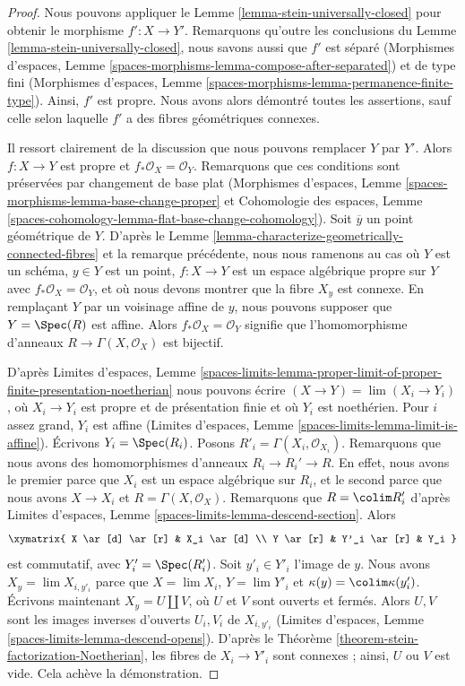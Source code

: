 \begin{proof}
Nous pouvons appliquer le Lemme \ref{lemma-stein-universally-closed} pour obtenir le
morphisme $f' : X \to Y'$.
Remarquons qu'outre les
conclusions du Lemme \ref{lemma-stein-universally-closed}, nous
savons aussi que $f'$ est séparé
(Morphismes d'espaces, Lemme
\ref{spaces-morphisms-lemma-compose-after-separated})
et de type fini
(Morphismes d'espaces, Lemme
\ref{spaces-morphisms-lemma-permanence-finite-type}).
Ainsi, $f'$ est propre. Nous avons alors démontré toutes les
assertions, sauf celle
selon laquelle $f'$ a des fibres géométriques connexes.

\medskip\noindent
Il ressort clairement de la discussion que nous pouvons remplacer $Y$ par $Y'$.
Alors $f : X \to Y$ est propre et $f_*\mathcal{O}_X = \mathcal{O}_Y$.
Remarquons que ces conditions sont préservées par changement de base plat
(Morphismes d'espaces, Lemme \ref{spaces-morphisms-lemma-base-change-proper}
et
Cohomologie des espaces, Lemme
\ref{spaces-cohomology-lemma-flat-base-change-cohomology}).
Soit $\overline{y}$ un point géométrique de $Y$. D'après le
Lemme \ref{lemma-characterize-geometrically-connected-fibres}
et la remarque précédente, nous nous ramenons au cas où $Y$ est un
schéma, $y \in Y$ est un point, $f : X \to Y$ est un espace algébrique propre
sur $Y$ avec $f_*\mathcal{O}_X = \mathcal{O}_Y$,
et où nous devons montrer que la fibre $X_y$ est connexe.
En remplaçant $Y$ par un voisinage affine de $y$, nous pouvons
supposer que $Y = \Spec(R)$ est affine. Alors $f_*\mathcal{O}_X = \mathcal{O}_Y$
signifie que l'homomorphisme d'anneaux
$R \to \Gamma(X, \mathcal{O}_X)$ est bijectif.

\medskip\noindent
D'après Limites d'espaces, Lemme
\ref{spaces-limits-lemma-proper-limit-of-proper-finite-presentation-noetherian}
nous pouvons écrire $(X \to Y) = \lim (X_i \to Y_i)$, où $X_i \to Y_i$
est propre et de présentation finie et où $Y_i$ est noethérien. Pour $i$ assez
grand, $Y_i$ est affine (Limites d'espaces, Lemme
\ref{spaces-limits-lemma-limit-is-affine}).
Écrivons $Y_i = \Spec(R_i)$. Posons $R'_i = \Gamma(X_i, \mathcal{O}_{X_i})$.
Remarquons que nous avons des homomorphismes d'anneaux $R_i \to R_i' \to R$. En effet, nous avons
le premier parce que $X_i$ est un espace algébrique sur $R_i$, et le second parce que
nous avons $X \to X_i$ et $R = \Gamma(X, \mathcal{O}_X)$. Remarquons que
$R = \colim R'_i$ d'après Limites d'espaces, Lemme
\ref{spaces-limits-lemma-descend-section}.
Alors
$$
\xymatrix{
X \ar[d]  \ar[r] & X_i \ar[d] \\
Y \ar[r] & Y'_i \ar[r] & Y_i
}
$$
est commutatif, avec $Y'_i = \Spec(R'_i)$.
Soit $y'_i \in Y'_i$ l'image de $y$.
Nous avons $X_y = \lim X_{i, y'_i}$ parce que $X = \lim X_i$,
$Y = \lim Y'_i$ et $\kappa(y) = \colim \kappa(y'_i)$.
Écrivons maintenant $X_y = U \amalg V$, où $U$ et $V$ sont ouverts et fermés.
Alors $U, V$ sont les images inverses d'ouverts $U_i, V_i$ de $X_{i, y'_i}$
(Limites d'espaces, Lemme \ref{spaces-limits-lemma-descend-opens}).
D'après le Théorème \ref{theorem-stein-factorization-Noetherian}, les fibres
de $X_i \to Y'_i$ sont connexes ; ainsi, $U$ ou $V$ est vide.
Cela achève la démonstration.
\end{proof}

